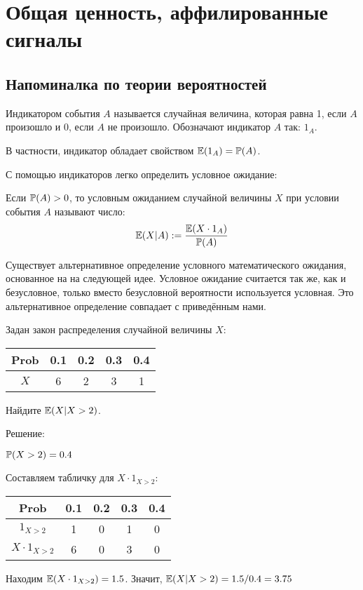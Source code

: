 \chapter{Общая ценность, аффилированные сигналы}


\section{Напоминалка по теории вероятностей}



\begin{mydef}
Индикатором события $ A $ называется случайная величина, которая равна 1, если $ A $ произошло и 0, если $ A $ не произошло. Обозначают индикатор $ A $ так: $ 1_{A} $.
\end{mydef}

В частности, индикатор обладает свойством $ \E(1_{A})=\P(A) $.

С помощью индикаторов легко определить условное ожидание:

\begin{mydef}
Если $ \P(A)>0 $, то условным ожиданием случайной величины $ X $ при условии события $ A $ называют число:
\[ \E(X|A):=\frac{\E(X\cdot 1_{A})}{\P(A)} \]
\label{posit_condition}
\end{mydef}

Существует альтернативное определение условного математического ожидания, основанное на на следующей идее. Условное ожидание считается так же, как и безусловное, только вместо безусловной вероятности используется условная. Это альтернативное определение совпадает с приведённым нами.

\begin{myex} Задан закон распределения случайной величины $X$:


\begin{tabular}{c|cccc}
Prob & 0.1 & 0.2 & 0.3 & 0.4 \\
\hline
$X$ & 6 & 2 & 3 & 1 \\
\end{tabular}

Найдите $ \E(X|X>2) $.

Решение:

$\P(X>2)=0.4$

Составляем табличку для $ X\cdot 1_{X>2} $:

\begin{tabular}{c|cccc}
Prob & 0.1 & 0.2 & 0.3 & 0.4 \\
\hline
$1_{X>2}$ & 1 & 0 & 1 & 0 \\
$X\cdot 1_{X>2}$ & 6 & 0 & 3 & 0 \\
\end{tabular}

Находим $ \E(X\cdot 1_{X>2})=1.5 $. Значит, $ \E(X|X>2)=1.5/0.4=3.75 $

\end{myex}


